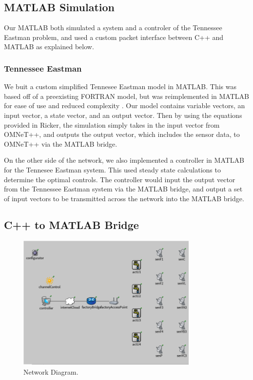 \subsection{MATLAB Simulation}
  Our MATLAB both simulated a system and a controler of the
  Tennessee Eastman problem, and used a custom packet interface
  between C++ and MATLAB as explained below.

\subsubsection{Tennessee Eastman}
  We buit a custom simplified Tennesee Eastman model in MATLAB.  
  This was based off of a preexisting FORTRAN model, but was
  reimplemented in MATLAB for ease of use and reduced complexity 
  .  Our model contains variable vectors, an
  input vector, a state vector, and an output vector. Then by 
  using the equations provided in Ricker, the
  simulation simply takes in the input vector from OMNeT++, and
  outputs the output vector, which includes the sensor data, to
  OMNeT++ via the MATLAB bridge.

  On the other side of the network, we also implemented a 
  controller in MATLAB for the Tennesee Eastman system.  This
  used steady state calculations to determine the optimal controls.
  The controller would input the output vector from the Tennessee
  Eastman system via the MATLAB bridge, and output a set of input
  vectors to be transmitted across the network into the MATLAB
  bridge.

\subsection{C++ to MATLAB Bridge}

\begin{figure}
        \centering
		\includegraphics[width=0.8\textwidth]{figs/network.png}
        \caption{Network Diagram.}
        \label{fig:system}        
\end{figure}
